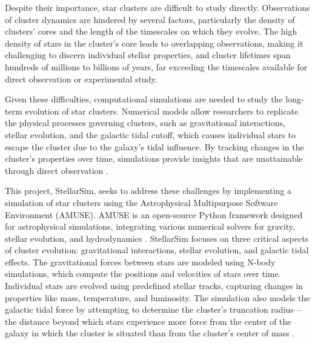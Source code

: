 \documentclass[10pt,twocolumn]{article}
\begin{document}
Despite their importance, star clusters are difficult to study directly. Observations of cluster dynamics are hindered by several factors, particularly the density of clusters' cores and the length of the timescales on which they evolve. The high density of stars in the cluster's core leads to overlapping observations, making it challenging to discern individual stellar properties, and cluster lifetimes span hundreds of millions to billions of years, far exceeding the timescales available for direct observation or experimental study.\cite{clusters}

Given these difficulties, computational simulations are needed to study the long-term evolution of star clusters. Numerical models allow researchers to replicate the physical processes governing clusters, such as gravitational interactions, stellar evolution, and the galactic tidal cutoff, which causes individual stars to escape the cluster due to the galaxy's tidal influence. By tracking changes in the cluster's properties over time, simulations provide insights that are unattainable through direct observation \cite{whitehead2013amuse}.

This project, StellarSim, seeks to address these challenges by implementing a simulation of star clusters using the Astrophysical Multipurpose Software Environment (AMUSE). AMUSE is an open-source Python framework designed for astrophysical simulations, integrating various numerical solvers for gravity, stellar evolution, and hydrodynamics \cite{pelupessy2013amuse}. StellarSim focuses on three critical aspects of cluster evolution: gravitational interactions, stellar evolution, and galactic tidal effects. The gravitational forces between stars are modeled using N-body simulations, which compute the positions and velocities of stars over time. Individual stars are evolved using predefined stellar tracks, capturing changes in properties like mass, temperature, and luminosity. The simulation also models the galactic tidal force by attempting to determine the cluster's truncation radius—the distance beyond which stars experience more force from the center of the galaxy in which the cluster is situated than from the cluster's center of mass \cite{portegies2013multiphysics}.
\end{document}
